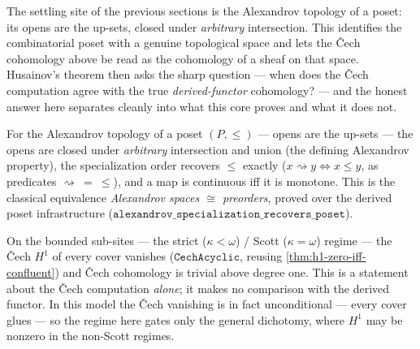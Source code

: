 The settling site of the previous sections is the Alexandrov topology of a poset: its opens
are the up-sets, closed under \emph{arbitrary} intersection. This identifies the combinatorial
poset with a genuine topological space and lets the \v{C}ech cohomology above be read as the
cohomology of a sheaf on that space. Husainov's theorem then asks the sharp question --- when
does the \v{C}ech computation agree with the true \emph{derived-functor} cohomology? --- and the
honest answer here separates cleanly into what this core proves and what it does not.

\begin{theorem}\label{thm:alexandrov-recovers-poset}\leanok{}
For the Alexandrov topology of a poset $(P,\le)$ --- opens are the up-sets --- the opens are
closed under \emph{arbitrary} intersection and union (the defining Alexandrov property), the
specialization order recovers $\le$ exactly ($x \rightsquigarrow y \iff x \le y$, as predicates
$\rightsquigarrow\ =\ \le$), and a map is continuous iff it is monotone. This is the classical
equivalence \emph{Alexandrov spaces $\cong$ preorders}, proved over the derived poset
infrastructure ($\texttt{alexandrov\_specialization\_recovers\_poset}$).
\end{theorem}

\begin{theorem}\label{thm:husainov-cech-acyclic}\leanok{}
On the bounded sub-sites --- the strict ($\kappa<\omega$) / Scott ($\kappa=\omega$) regime --- the
\v{C}ech $H^1$ of every cover vanishes ($\texttt{CechAcyclic}$, reusing
\cref{thm:h1-zero-iff-confluent}) and \v{C}ech cohomology is trivial above degree one. This is a
statement about the \v{C}ech computation \emph{alone}; it makes no comparison with the derived
functor. In this model the \v{C}ech vanishing is in fact unconditional --- every cover glues ---
so the regime here gates only the general dichotomy, where $H^1$ may be nonzero in the non-Scott
regimes.
\end{theorem}

